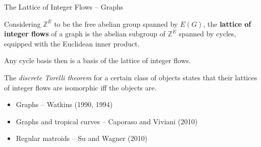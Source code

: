 \documentclass[9pt]{beamer}
\def\Z{\mathbb Z}
\begin{document}
    \begin{frame}{The Lattice of Integer Flows -- Graphs}

        Considering $\Z^E$ to be the free abelian group spanned by $E(G)$, the \textbf{lattice of integer flows} of a graph is the abelian subgroup of $\Z^E$ spanned by cycles, equipped with the Euclidean inner product.

        \pause

        \vspace{12pt}
        
        Any cycle basis then is a basis of the lattice of integer flows.

        \pause

        \vspace{12pt}

        The \textit{discrete Torelli theorem} for a certain class of objects states that their lattices of integer flows are isomorphic iff the objects are.

        \pause

        \vspace{12pt}

        \begin{itemize}
            \item Graphs -- Watkins (1990, 1994)\pause
            \item Graphs and tropical curves -- Caporaso and Viviani (2010)\pause
            \item Regular matroids -- Su and Wagner (2010)
        \end{itemize}
        
    \end{frame}
\end{document}
